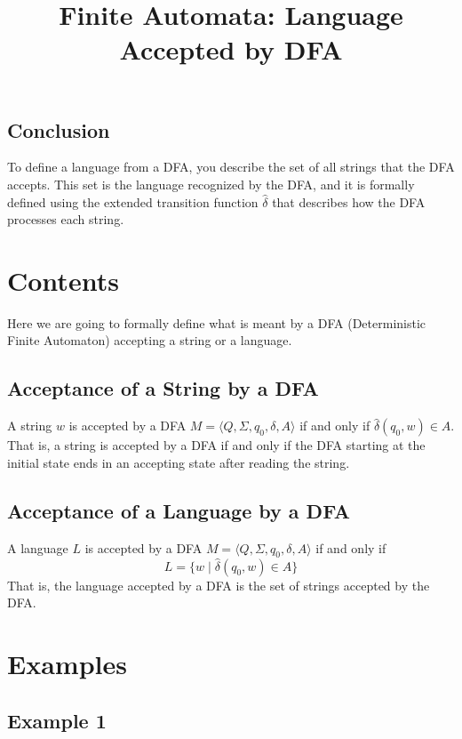 \documentclass[12pt]{article}
\begin{document}
\subsection*{Conclusion}
To define a language from a DFA, you describe the set of all strings that the DFA accepts. This set is the language recognized by the DFA, and it is formally defined using the extended transition function \( \hat{\delta} \) that describes how the DFA processes each string.

\title{Finite Automata: Language Accepted by DFA}
\author{}
\date{}
\maketitle

\section*{Contents}
Here we are going to formally define what is meant by a DFA (Deterministic Finite Automaton) accepting a string or a language.

\subsection*{Acceptance of a String by a DFA}
A string \( w \) is accepted by a DFA \( M = \langle Q, \Sigma, q_0, \delta, A \rangle \) if and only if \( \hat{\delta}(q_0, w) \in A \). That is, a string is accepted by a DFA if and only if the DFA starting at the initial state ends in an accepting state after reading the string.

\subsection*{Acceptance of a Language by a DFA}
A language \( L \) is accepted by a DFA \( M = \langle Q, \Sigma, q_0, \delta, A \rangle \) if and only if 
\[ 
L = \{ w \mid \hat{\delta}(q_0, w) \in A \} 
\]
That is, the language accepted by a DFA is the set of strings accepted by the DFA.

\section*{Examples}
\newpage
\subsection*{Example 1}
\begin{center}
    \end{center}
\end{document}
